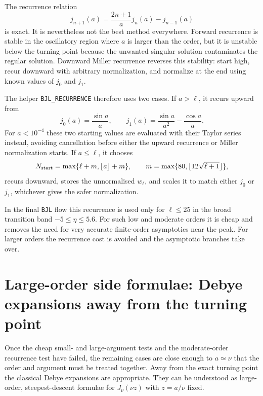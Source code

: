 \documentclass[11pt,a4paper]{article}
\newcommand{\code}[1]{\texttt{#1}}
\begin{document}
The recurrence relation
\begin{equation}
  j_{n+1}(a)=\frac{2n+1}{a}j_n(a)-j_{n-1}(a)
\end{equation}
is exact.  It is nevertheless not the best method everywhere.  Forward recurrence is stable in the oscillatory region where $a$ is larger than the order, but it is unstable below the turning point because the unwanted singular solution contaminates the regular solution.  Downward Miller recurrence reverses this stability: start high, recur downward with arbitrary normalization, and normalize at the end using known values of $j_0$ and $j_1$.

The helper \code{BJL\_RECURRENCE} therefore uses two cases.  If $a>\ell$, it recurs upward from
\begin{equation}
  j_0(a)=\frac{\sin a}{a},\qquad
  j_1(a)=\frac{\sin a}{a^2}-\frac{\cos a}{a}.
\end{equation}
For $a<10^{-4}$ these two starting values are evaluated with their Taylor
series instead, avoiding cancellation before either the upward recurrence or
Miller normalization starts.
If $a\le\ell$, it chooses
\begin{equation}
  N_{\rm start}=\max\{\ell+m,\lfloor a\rfloor+m\},\qquad
  m=\max\{80,\lfloor 12\sqrt{\ell+1}\rfloor\},
\end{equation}
recurs downward, stores the unnormalised $w_\ell$, and scales it to match either $j_0$ or $j_1$, whichever gives the safer normalization.

In the final \code{BJL} flow this recurrence is used only for $\ell\le25$ in the broad transition band $-5\le\eta\le5.6$.  For such low and moderate orders it is cheap and removes the need for very accurate finite-order asymptotics near the peak.  For larger orders the recurrence cost is avoided and the asymptotic branches take over.

\section{Large-order side formulae: Debye expansions away from the turning point}

Once the cheap small- and large-argument tests and the moderate-order recurrence test have failed, the remaining cases are close enough to $a\simeq\nu$ that the order and argument must be treated together.  Away from the exact turning point the classical Debye expansions are appropriate.  They can be understood as large-order, steepest-descent formulae for $J_\nu(\nu z)$ with $z=a/\nu$ fixed.
\end{document}
